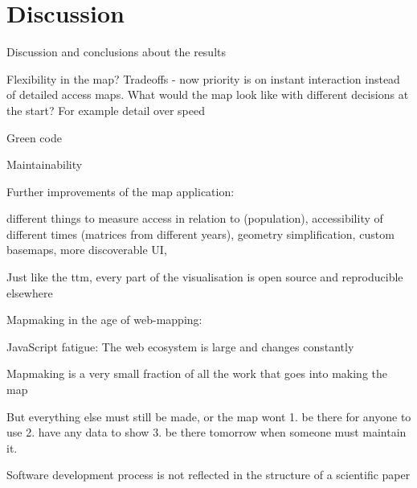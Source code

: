 \section{Discussion}

Discussion and conclusions about the results

Flexibility in the map? Tradeoffs - now priority is on instant interaction instead of detailed access maps.
What would the map look like with different decisions at the start? For example detail over speed

Green code

Maintainability

Further improvements of the map application:

different things to measure access in relation to (population),
accessibility of different times (matrices from different years),
geometry simplification,
custom basemaps,
more discoverable UI,

Just like the \acrshort{ttm}, every part of the visualisation is open source and reproducible elsewhere

Mapmaking in the age of web-mapping:

JavaScript fatigue: The web ecosystem is large and changes constantly

Mapmaking is a very small fraction of all the work that goes into making the map

But everything else must still be made, or the map wont 1. be there for anyone to use 2. have any data to show 3. be there tomorrow when someone must maintain it.

Software development process is not reflected in the structure of a scientific paper
